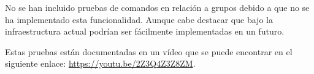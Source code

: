 No se han incluido pruebas de comandos en relación a grupos debido a que no se ha implementado esta funcionalidad. Aunque cabe destacar que bajo la 
infraestructura actual podrían ser fácilmente implementadas en un futuro.

Estas pruebas están documentadas en un vídeo que se puede encontrar en el siguiente enlace: \url{https://youtu.be/2Z3Q4Z3Z8ZM}.